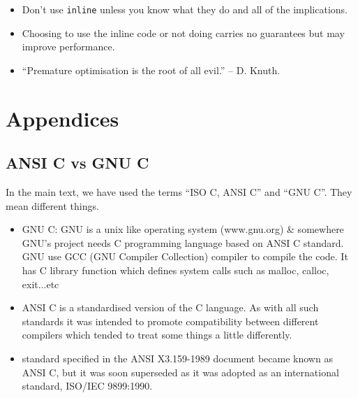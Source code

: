 \documentclass[a4paper]{article}
\begin{document}
\begin{itemize}
    \item Don't use \texttt{inline} unless you know what they do and all of the
implications.
    \item Choosing to use the inline code or not doing carries no guarantees
but may improve performance.
    \item  ``Premature optimisation is the root of all evil.'' -- D. Knuth.
\end{itemize}



\newpage
\appendix

\section{Appendices}

\newpage
\subsection{ANSI C vs GNU C}
\label{app:gnu_vs_iso}
In the main text, we have used the terms ``ISO C, ANSI C'' and ``GNU C''. They mean different things.

\begin{itemize}
    \item GNU C: GNU is a unix like operating system (www.gnu.org) \& somewhere GNU's project needs C programming language based on ANSI C standard. GNU use GCC (GNU Compiler Collection) compiler to compile the code. It has C library function which defines system calls such as malloc, calloc, exit...etc
    \item ANSI C is a standardised version of the C language. As with all such standards it was intended to promote compatibility between different compilers which tended to treat some things a little differently.
    \item standard specified in the ANSI X3.159-1989 document became known as ANSI C, but it was soon superseded as it was adopted as an international standard, ISO/IEC 9899:1990.
\end{itemize}



\newpage
\end{document}
